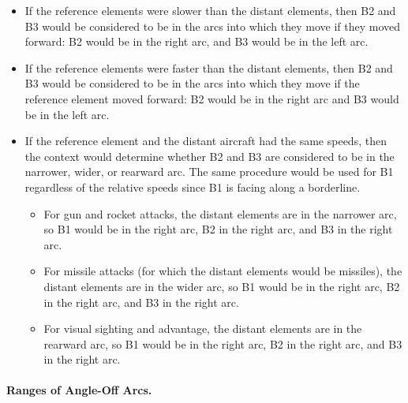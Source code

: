 {\begin{itemize}
\begin{itemize}
\item
If the reference elements were slower than the distant elements, then B2 and B3 would be considered to be in the arcs into which they move if they moved forward: B2 would be in the right  arc, and B3 would be in the left  arc.

\item
If the reference elements were faster than the distant elements, then B2 and B3 would be considered to be in the arcs into which they move if the reference element moved forward: B2 would be in the right  arc and B3 would be in the left  arc.

\item
If the reference element and the distant aircraft had the same speeds, then the context would determine whether B2 and B3 are considered to be in the narrower, wider, or rearward arc. The same procedure would be used for B1 regardless of the relative speeds since B1 is facing along a borderline.

\begin{itemize}

\item For gun and rocket attacks, the distant elements are in the narrower arc, so B1 would be in the right  arc, B2 in the right  arc, and B3 in the right  arc.

\item For missile attacks (for which the distant elements would be missiles), the distant elements are in the wider arc, so B1 would be in the right  arc, B2 in the right  arc, and B3 in the right  arc.

\item For visual sighting and advantage, the distant elements are in the rearward arc, so B1 would be in the right  arc, B2 in the right  arc, and B3 in the right  arc.

\end{itemize}

\end{itemize}

\end{itemize}


\paragraph{Ranges of Angle-Off Arcs.}
\label{rule:ranges-of-angle-off-arcs}

}
